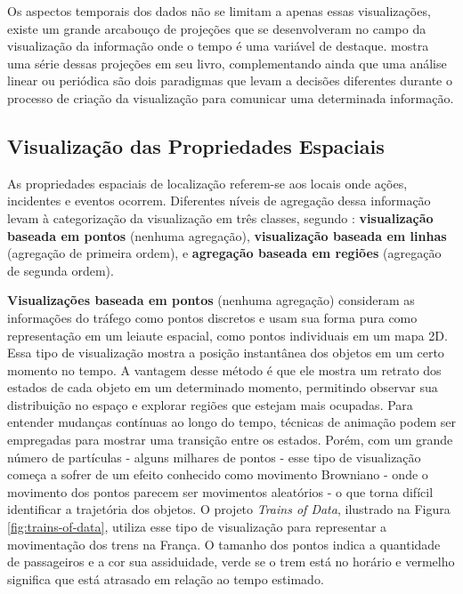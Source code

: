 Os aspectos temporais dos dados não se limitam a apenas essas visualizações, existe
um grande arcabouço de projeções que se desenvolveram no campo da visualização da
informação onde o tempo é uma variável de destaque. \citet{Cairo2016} mostra uma série
dessas projeções em seu livro, complementando ainda que uma análise linear ou periódica
são dois paradigmas que levam a decisões diferentes durante o processo de criação da visualização
para comunicar uma determinada informação.


\subsection{Visualização das Propriedades Espaciais}

As propriedades espaciais de localização referem-se aos locais onde ações, incidentes e
eventos ocorrem. Diferentes níveis de agregação dessa informação levam à categorização
da visualização em três classes, segundo \citet{Chen2015}: \textbf{visualização baseada em pontos}
(nenhuma agregação), \textbf{visualização baseada em linhas} (agregação de primeira ordem), e
\textbf{agregação baseada em regiões} (agregação de segunda ordem).

\textbf{Visualizações baseada em pontos} (nenhuma agregação)
consideram as informações do tráfego como pontos discretos e usam sua forma
pura como representação em um leiaute espacial, como pontos individuais em um mapa 2D.
Essa tipo de visualização mostra a posição instantânea dos objetos em um certo momento
no tempo. A vantagem desse método é que ele mostra um retrato dos estados de cada objeto em um
determinado momento, permitindo observar sua distribuição no espaço e explorar regiões que estejam
mais ocupadas. Para entender mudanças contínuas ao longo do tempo, técnicas de animação podem
ser empregadas para mostrar uma transição entre os estados. Porém, com um grande número de partículas
- alguns milhares de pontos - esse tipo de visualização começa a sofrer
de um efeito conhecido como movimento Browniano - onde o movimento dos pontos parecem ser movimentos
aleatórios - o que torna difícil identificar a trajetória dos objetos. O projeto \emph{Trains of Data},
ilustrado na Figura \ref{fig:trains-of-data}, utiliza esse tipo de visualização para
representar a movimentação dos trens na França. O tamanho dos pontos indica a quantidade de passageiros e a cor
sua assiduidade, verde se o trem está no horário e vermelho significa que está atrasado
em relação ao tempo estimado.

